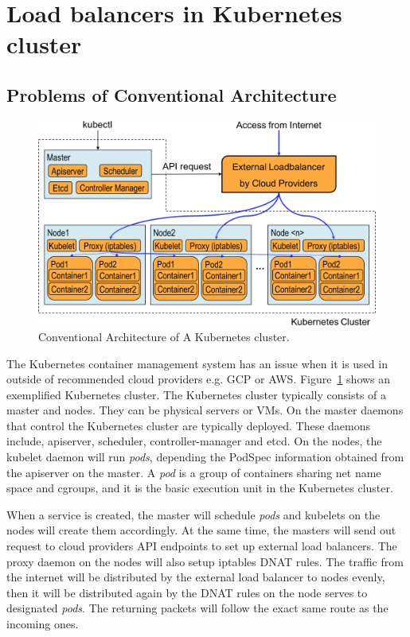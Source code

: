 \section{Load balancers in Kubernetes cluster}\label{Load balancers in Kubernetes cluster}

\subsection{Problems of Conventional Architecture}

\begin{figure}
\includegraphics[width=\columnwidth]{Figs/K8sConventional}
\caption{Conventional Architecture of A Kubernetes cluster.}
\label{fig:K8sConventional}
\end{figure}

The Kubernetes container management system has an issue when it is used in outside of recommended cloud providers e.g. GCP or AWS.
Figure~\ref{fig:K8sConventional} shows an exemplified Kubernetes cluster.
The Kubernetes cluster typically consists of a master and nodes. They can be physical servers or VMs.
On the master daemons that control the Kubernetes cluster are typically deployed. 
These daemons include, apiserver, scheduler, controller-manager and etcd. 
On the nodes, the kubelet daemon will run {\it pods}, depending the PodSpec information obtained from the apiserver on the master.
A {\em pod} is a group of containers sharing net name space and cgroups, 
and it is the basic execution unit in the Kubernetes cluster.

When a service is created, the master will schedule {\em pods} and kubelets on the nodes will create them accordingly.
At the same time, the masters will send out request to cloud providers API endpoints to set up external load balancers.
The proxy daemon on the nodes will also setup iptables DNAT\cite{MartinA.Brown2017} rules. 
The traffic from the internet will be distributed by the external load balancer to nodes evenly, 
then it will be distributed again by the DNAT rules on the node serves to designated {\em pods}. 
The returning packets will follow the exact same route as the incoming ones.

